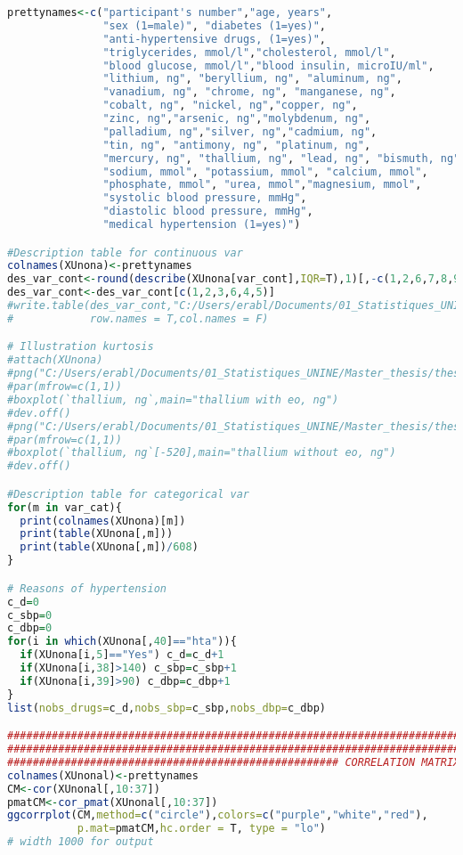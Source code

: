 \documentclass[a4paper]{book}
\begin{document}
\begin{lstlisting}[language=R]
prettynames<-c("participant's number","age, years",
               "sex (1=male)", "diabetes (1=yes)",
               "anti-hypertensive drugs, (1=yes)",
               "triglycerides, mmol/l","cholesterol, mmol/l",
               "blood glucose, mmol/l","blood insulin, microIU/ml",
               "lithium, ng", "beryllium, ng", "aluminum, ng",
               "vanadium, ng", "chrome, ng", "manganese, ng",
               "cobalt, ng", "nickel, ng","copper, ng",
               "zinc, ng","arsenic, ng","molybdenum, ng",
               "palladium, ng","silver, ng","cadmium, ng",
               "tin, ng", "antimony, ng", "platinum, ng",
               "mercury, ng", "thallium, ng", "lead, ng", "bismuth, ng",
               "sodium, mmol", "potassium, mmol", "calcium, mmol",
               "phosphate, mmol", "urea, mmol","magnesium, mmol",
               "systolic blood pressure, mmHg",
               "diastolic blood pressure, mmHg",
               "medical hypertension (1=yes)")

#Description table for continuous var
colnames(XUnona)<-prettynames
des_var_cont<-round(describe(XUnona[var_cont],IQR=T),1)[,-c(1,2,6,7,8,9,10,13)]
des_var_cont<-des_var_cont[c(1,2,3,6,4,5)]
#write.table(des_var_cont,"C:/Users/erabl/Documents/01_Statistiques_UNINE/Master_thesis/thesis/des_cont_var.txt",eol="\\\\\n",quote=F,sep="&",
#            row.names = T,col.names = F)

# Illustration kurtosis
#attach(XUnona)
#png("C:/Users/erabl/Documents/01_Statistiques_UNINE/Master_thesis/thesis/figures/outlier1.png",width = 404, height=404)
#par(mfrow=c(1,1))
#boxplot(`thallium, ng`,main="thallium with eo, ng")
#dev.off()
#png("C:/Users/erabl/Documents/01_Statistiques_UNINE/Master_thesis/thesis/figures/outlier2.png",width = 404, height=404)
#par(mfrow=c(1,1))
#boxplot(`thallium, ng`[-520],main="thallium without eo, ng")
#dev.off()

#Description table for categorical var
for(m in var_cat){
  print(colnames(XUnona)[m])
  print(table(XUnona[,m]))
  print(table(XUnona[,m])/608)
}

# Reasons of hypertension
c_d=0
c_sbp=0
c_dbp=0
for(i in which(XUnona[,40]=="hta")){
  if(XUnona[i,5]=="Yes") c_d=c_d+1
  if(XUnona[i,38]>140) c_sbp=c_sbp+1
  if(XUnona[i,39]>90) c_dbp=c_dbp+1
}
list(nobs_drugs=c_d,nobs_sbp=c_sbp,nobs_dbp=c_dbp)

#######################################################################
#######################################################################
#################################################### CORRELATION MATRIX
colnames(XUnonal)<-prettynames
CM<-cor(XUnonal[,10:37])
pmatCM<-cor_pmat(XUnonal[,10:37])
ggcorrplot(CM,method=c("circle"),colors=c("purple","white","red"),
           p.mat=pmatCM,hc.order = T, type = "lo")
# width 1000 for output


\end{lstlisting}
\end{document}
